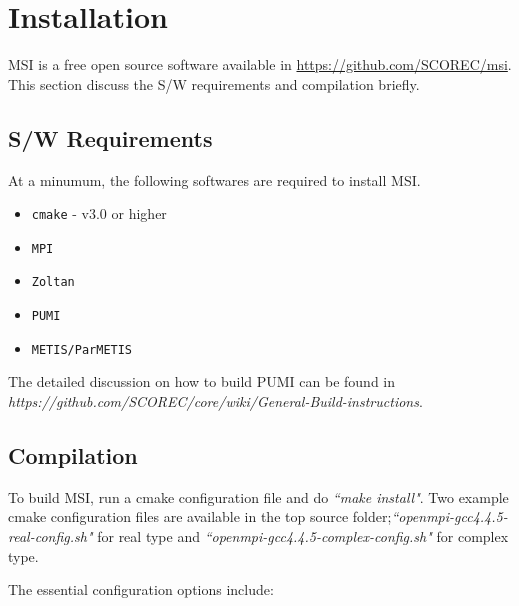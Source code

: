 \documentclass[11pt]{article}  %
\begin{document}
\tableofcontents
\newpage


\section{Installation}\label{install}

MSI is a free open source software available in \url{https://github.com/SCOREC/msi}. 
This section discuss the S/W requirements and compilation briefly. 

\subsection{S/W Requirements}

At a minumum, the following softwares are required to install MSI.
\begin{itemize}
\item \texttt{cmake} - v3.0 or higher
\item \texttt{MPI}
\item \texttt{Zoltan}~\cite{ZoltanOverviewArticle2002}
\item \texttt{PUMI}~\cite{pumi16, pumiweb}
\item \texttt{METIS/ParMETIS} ~\cite{ParmetisOverviewArticle2002}
\end{itemize}

The detailed discussion on how to build PUMI can be found in \emph{https://github.com/SCOREC/core/wiki/General-Build-instructions}.

\subsection{Compilation}

To build MSI, run a cmake configuration file and do \emph{``make install"}. Two example cmake configuration files are available in the top source folder;\emph{``openmpi-gcc4.4.5-real-config.sh"} for real type and \emph{``openmpi-gcc4.4.5-complex-config.sh"} for complex type.

The essential configuration options include: 
\end{document}
